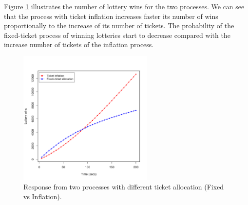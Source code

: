 \documentclass[10pt]{scrartcl}
\begin{document}
Figure \ref{fig:test2b} illustrates the number of lottery wins for the two processes.  We can see that the process with ticket inflation increases faster its number of wins proportionally to the increase of its number of tickets.  The probability of the fixed-ticket process of winning lotteries start to decrease compared with the increase number of tickets of the inflation process.

\begin{figure}
  \centering
  \includegraphics[width=0.6\textwidth]{test2}
  \caption{Response from two processes with different ticket allocation (Fixed vs Inflation).}\label{fig:test2b}
\end{figure}

% 
% 
\end{document}
